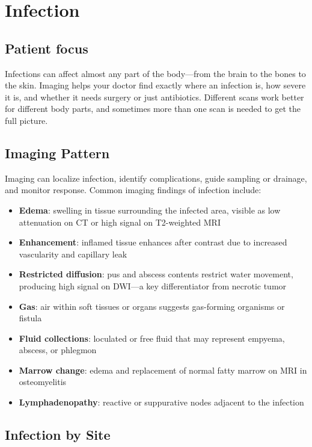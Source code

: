 \chapter{Infection}

\section*{Patient focus}
Infections can affect almost any part of the body---from the brain to the bones to the skin. Imaging helps your doctor find exactly where an infection is, how severe it is, and whether it needs surgery or just antibiotics. Different scans work better for different body parts, and sometimes more than one scan is needed to get the full picture.


\label{ch:ch57_infection}

\section{Imaging Pattern}
Imaging can localize infection, identify complications, guide sampling or drainage, and monitor response. Common imaging findings of infection include:

\begin{itemize}
  \item \textbf{Edema}: swelling in tissue surrounding the infected area, visible as low attenuation on CT or high signal on T2-weighted MRI
  \item \textbf{Enhancement}: inflamed tissue enhances after contrast due to increased vascularity and capillary leak
  \item \textbf{Restricted diffusion}: pus and abscess contents restrict water movement, producing high signal on DWI---a key differentiator from necrotic tumor
  \item \textbf{Gas}: air within soft tissues or organs suggests gas-forming organisms or fistula
  \item \textbf{Fluid collections}: loculated or free fluid that may represent empyema, abscess, or phlegmon
  \item \textbf{Marrow change}: edema and replacement of normal fatty marrow on MRI in osteomyelitis
  \item \textbf{Lymphadenopathy}: reactive or suppurative nodes adjacent to the infection
\end{itemize}

\section{Infection by Site}

